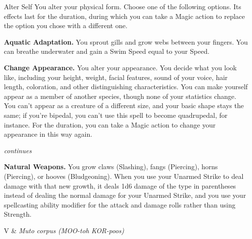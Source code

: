 \begin{Spell}[
  tags=Concentration,
  level=2nd,
  time=1 Action,
  range=Self,
  components={V, S},
  duration=1 Hour,
  school=Transmutation,
  attack=None,
  effect=Shapechanging
]{Alter Self}
You alter your physical form. Choose one of the following options. Its effects last for the duration, during which you can take a Magic action to replace the option you chose with a different one.

\textbf{Aquatic Adaptation.} You sprout gills and grow webs between your fingers. You can breathe underwater and gain a Swim Speed equal to your Speed.

\textbf{Change Appearance.} You alter your appearance. You decide what you look like, including your height, weight, facial features, sound of your voice, hair length, coloration, and other distinguishing characteristics. You can make yourself appear as a member of another species, though none of your statistics change. You can't appear as a creature of a different size, and your basic shape stays the same; if you're bipedal, you can't use this spell to become quadrupedal, for instance. For the duration, you can take a Magic action to change your appearance in this way again.

\hfill \textit{\footnotesize continues}
\newpage
{}

\textbf{Natural Weapons.} You grow claws (Slashing), fangs (Piercing), horns (Piercing), or hooves (Bludgeoning). When you use your Unarmed Strike to deal damage with that new growth, it deals 1d6 damage of the type in parentheses instead of dealing the normal damage for your Unarmed Strike, and you use your spellcasting ability modifier for the attack and damage rolls rather than using Strength.

\begin{components}
V & \textit{Muto corpus (MOO-toh KOR-poos)}
\end{components}
\end{Spell}


